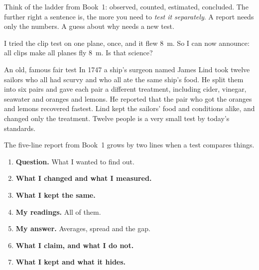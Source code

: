 Think of the ladder from Book~1: observed, counted, estimated, concluded. The further right a sentence is, the more you need to \emph{test it separately}. A report needs only the numbers. A guess about why needs a new test.

\begin{multix}[hmm]\multixbot[hmm]\tcblower
I tried the clip test on one plane, once, and it flew 8~m. So I can now announce: all clips make all planes fly 8~m. Is that science?
\end{multix}

\begin{worked}{An old, famous fair test}
In 1747 a ship's surgeon named James Lind took twelve sailors who all had scurvy and who all ate the same ship's food. He split them into six pairs and gave each pair a different treatment, including cider, vinegar, seawater and oranges and lemons. He reported that the pair who got the oranges and lemons recovered fastest. Lind kept the sailors' food and conditions alike, and changed only the treatment. Twelve people is a very small test by today's standards.
\end{worked}

The five-line report from Book~1 grows by two lines when a test compares things.

\begin{tcolorbox}[enhanced,colback=white,colframe=ink!60,boxrule=1pt,arc=2mm,left=8pt,right=8pt,top=5pt,bottom=5pt,before skip=7pt,after skip=7pt]
\sffamily\small
\begin{enumerate}[leftmargin=1.6em,itemsep=0.2em]
\item \textbf{Question.} What I wanted to find out.
\item \textbf{What I changed and what I measured.}
\item \textbf{What I kept the same.}
\item \textbf{My readings.} All of them.
\item \textbf{My answer.} Averages, spread and the gap.
\item \textbf{What I claim, and what I do not.}
\item \textbf{What I kept and what it hides.}
\end{enumerate}
\end{tcolorbox}

\clearpage

